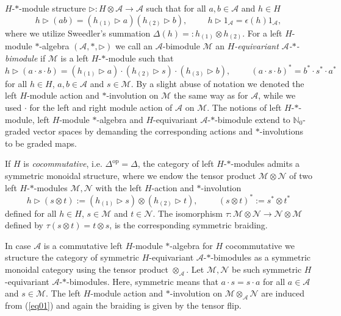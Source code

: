 \documentclass[a4paper,11pt]{article}
\begin{document}
$H$-$*$-module structure $\rhd\colon H\otimes\mathcal{A}\rightarrow\mathcal{A}$
such that for all $a,b\in\mathcal{A}$ and $h\in H$
\begin{equation}
    h\rhd(ab)=(h_{(1)}\rhd a)(h_{(2)}\rhd b),\hspace{1cm}
    h\rhd 1_\mathcal{A}=\epsilon(h)1_\mathcal{A},
\end{equation}
where we utilize Sweedler's summation $\Delta(h)=:h_{(1)}\otimes h_{(2)}$.
For a left $H$-module $*$-algebra $(\mathcal{A},*,\rhd)$ we call an $\mathcal{A}$-bimodule
$\mathcal{M}$ an \textit{$H$-equivariant $\mathcal{A}$-$*$-bimodule} if $\mathcal{M}$
is a left $H$-$*$-module such that
\begin{equation}
    h\rhd(a\cdot s\cdot b)=(h_{(1)}\rhd a)\cdot(h_{(2)}\rhd s)
    \cdot(h_{(3)}\rhd b),\hspace{1cm}
    (a\cdot s\cdot b)^*=b^*\cdot s^*\cdot a^*
\end{equation}
for all $h\in H$, $a,b\in\mathcal{A}$ and $s\in\mathcal{M}$.
By a slight abuse of notation we denoted the left $H$-module action and $*$-involution on
$\mathcal{M}$ the same way as for $\mathcal{A}$, while we used $\cdot$ for the
left and right module action of $\mathcal{A}$ on $\mathcal{M}$.
The notions of left $H$-$*$-module, left $H$-module $*$-algebra
and $H$-equivariant $\mathcal{A}$-$*$-bimodule extend to
$\mathbb{N}_0$-graded vector spaces by demanding the 
corresponding actions and $*$-involutions to be graded maps.

If $H$ is \textit{cocommutative}, i.e. $\Delta^\mathrm{op}=\Delta$, the category of left $H$-$*$-modules admits a symmetric monoidal structure,
where we endow the tensor product
$\mathcal{M}\otimes\mathcal{N}$ of two left $H$-$*$-modules $\mathcal{M},\mathcal{N}$
with the left $H$-action and $*$-involution
\begin{equation}\label{eq01}
    h\rhd(s\otimes t):=(h_{(1)}\rhd s)\otimes(h_{(2)}\rhd t),\hspace{1cm}
    (s\otimes t)^*:=s^*\otimes t^*
\end{equation}
defined for all $h\in H$, $s\in\mathcal{M}$ and $t\in\mathcal{N}$.
The isomorphism $\tau\colon\mathcal{M}\otimes \mathcal{N}\to \mathcal{N}\otimes \mathcal{M}$ defined by $\tau(s\otimes t)=t\otimes s$,
is the corresponding symmetric braiding.

In case $\mathcal{A}$ is a commutative left $H$-module $*$-algebra for $H$ cocommutative
we structure the category of symmetric $H$-equivariant
$\mathcal{A}$-$*$-bimodules
as a symmetric monoidal category using the tensor product $\otimes_\mathcal{A}$.
Let $\mathcal{M},\mathcal{N}$ be such symmetric $H$-equivariant
$\mathcal{A}$-$*$-bimodules. Here, symmetric means that 
$a\cdot s=s\cdot a$ for all $a\in \mathcal{A}$ and $s\in\mathcal{M}$. The left $H$-module action
and $*$-involution on $\mathcal{M}\otimes_\mathcal{A}\mathcal{N}$ are induced from
(\ref{eq01}) and again the braiding is given by the tensor flip. 
\end{document}
